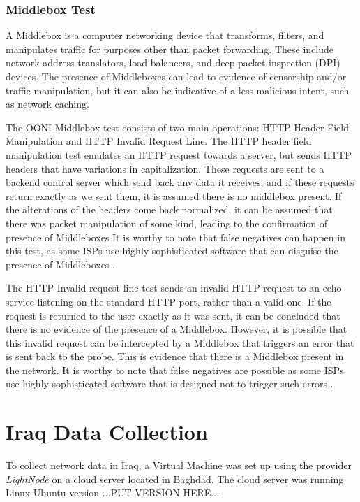 \subsubsection{Middlebox Test}

A Middlebox is a computer networking device that transforms, filters, and manipulates traffic for purposes other than packet forwarding. These include network address translators, load balancers, and deep packet inspection (DPI) devices. The presence of Middleboxes can lead to evidence of censorship and/or traffic manipulation, but it can also be indicative of a less malicious intent, such as network caching.

The OONI Middlebox test consists of two main operations: HTTP Header Field Manipulation and HTTP Invalid Request Line. The HTTP header field manipulation test emulates an HTTP request towards a server, but sends HTTP headers that have variations in capitalization. These requests are sent to a backend control server which send back any data it receives, and if these requests return exactly as we sent them, it is assumed there is no middlebox present. If the alterations of the headers come back normalized, it can be assumed that there was packet manipulation of some kind, leading to the confirmation of presence of Middleboxes It is worthy to note that false negatives can happen in this test, as some ISPs use highly sophisticated software that can disguise the presence of Middleboxes \cite{ooniHTTPHeader}.  

The HTTP Invalid request line test sends an invalid HTTP request to an echo service listening on the standard HTTP port, rather than a valid one. If the request is returned to the user exactly as it was sent, it can be concluded that there is no evidence of the presence of a Middlebox. However, it is possible that this invalid request can be intercepted by a Middlebox that triggers an error that is sent back to the probe. This is evidence that there is a Middlebox present in the network. It is worthy to note that false negatives are possible as some ISPs use highly sophisticated software that is designed not to trigger such errors \cite{ooniHTTPInvalid}. 


\section{Iraq Data Collection}

To collect network data in Iraq, a Virtual Machine was set up using the provider \textit{LightNode} \cite{lightnodeLightNodeGlobal} on a cloud server located in Baghdad. The cloud server was running Linux Ubuntu version ...PUT VERSION HERE...


